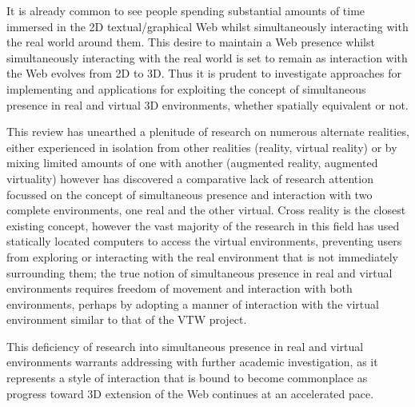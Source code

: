 It is already common to see people spending substantial amounts of time immersed in the 2D textual/graphical Web whilst simultaneously interacting with the real world around them. This desire to maintain a Web presence whilst simultaneously interacting with the real world is set to remain as interaction with the Web evolves from 2D to 3D. Thus it is prudent to investigate approaches for implementing and applications for exploiting the concept of simultaneous presence in real and virtual 3D environments, whether spatially equivalent or not.

This review has unearthed a plenitude of research on numerous alternate realities, either experienced in isolation from other realities (reality, virtual reality) or by mixing limited amounts of one with another (augmented reality, augmented virtuality) however has discovered a comparative lack of research attention focussed on the concept of simultaneous presence and interaction with two complete environments, one real and the other virtual. Cross reality is the closest existing concept, however the vast majority of the research in this field has used statically located computers to access the virtual environments, preventing users from exploring or interacting with the real environment that is not immediately surrounding them; the true notion of simultaneous presence in real and virtual environments requires freedom of movement and interaction with both environments, perhaps by adopting a manner of interaction with the virtual environment similar to that of the VTW project.

This deficiency of research into simultaneous presence in real and virtual environments warrants addressing with further academic investigation, as it represents a style of interaction that is bound to become commonplace as progress toward 3D extension of the Web continues at an accelerated pace.